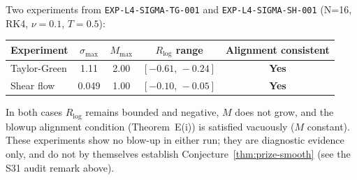 \documentclass[11pt]{article}
\theoremstyle{definition}
\theoremstyle{remark}
\begin{document}
Two experiments from \texttt{EXP-L4-SIGMA-TG-001} and \texttt{EXP-L4-SIGMA-SH-001}
(N=16, RK4, $\nu=0.1$, $T=0.5$):

\begin{center}
\begin{tabular}{lcccc}
\toprule
Experiment & $\sigma_{\max}$ & $M_{\max}$ & $R_{\log}$ range & Alignment consistent \\
\midrule
Taylor-Green & 1.11 & 2.00 & $[-0.61,\,-0.24]$ & \textbf{Yes} \\
Shear flow   & 0.049 & 1.00 & $[-0.10,\,-0.05]$ & \textbf{Yes} \\
\bottomrule
\end{tabular}
\end{center}

In both cases $R_{\log}$ remains bounded and negative, $M$ does not grow, and the
blowup alignment condition (Theorem~E(i)) is satisfied vacuously ($M$ constant).
These experiments show no blow-up in either run; they are diagnostic evidence
only, and do not by themselves establish Conjecture~\ref{thm:prize-smooth}
(see the S31 audit remark above).
\end{document}
